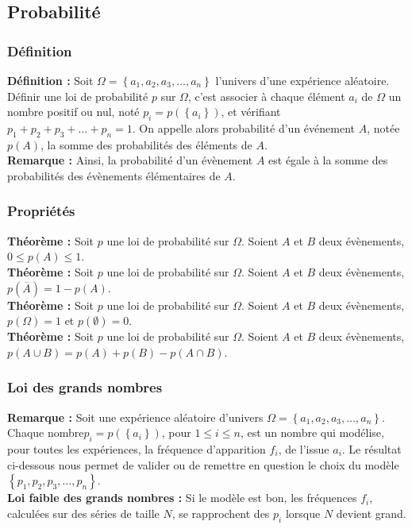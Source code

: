 \documentclass[a4paper,titlepage]{article}
\begin{document}
    \subsection{Probabilité}
        \subsubsection{Définition}
            \textbf{Définition :} Soit $\varOmega=\left\{a_{1},a_{2},a_{3},\ldots,a_{n}\right\}$ l’univers d’une expérience aléatoire. Définir une loi de probabilité $p$ sur $\varOmega$, c’est associer à chaque élément $a_{i}$ de $\varOmega$ un nombre positif ou nul, noté $p_{i}=p\left(\left\{a_{i}\right\}\right)$, et vérifiant $p_{1}+p_{2}+p_{3}+\ldots+p_{n}=1$. On appelle alors probabilité d’un événement $A$, notée $p\left(A\right)$, la somme des probabilités des éléments de $A$.
            \\
            \textbf{Remarque :} Ainsi, la probabilité d’un évènement $A$ est égale à la somme des probabilités des évènements élémentaires de $A$.
        \subsubsection{Propriétés}
            \textbf{Théorème :} Soit $p$ une loi de probabilité sur $\varOmega$. Soient $A$ et $B$ deux évènements, $0\leqslant p\left(A\right)\leqslant1$.
            \\
            \textbf{Théorème :} Soit $p$ une loi de probabilité sur $\varOmega$. Soient $A$ et $B$ deux évènements, $p\left(\overline{A}\right)=1-p\left(A\right)$.
            \\
            \textbf{Théorème :} Soit $p$ une loi de probabilité sur $\varOmega$. Soient $A$ et $B$ deux évènements, $p\left(\varOmega\right)=1$ et $p\left(\emptyset\right)=0$.
            \\
            \textbf{Théorème :} Soit $p$ une loi de probabilité sur $\varOmega$. Soient $A$ et $B$ deux évènements,\linebreak$p\left(A\cup B\right)=p\left(A\right)+p\left(B\right)-p\left(A\cap B\right)$.
        \subsubsection{Loi des grands nombres}
            \textbf{Remarque :} Soit une expérience aléatoire d’univers $\varOmega=\left\{a_{1},a_{2},a_{3},\ldots,a_{n}\right\}$. Chaque nombre\linebreak$p_{i}=p\left(\left\{a_{i}\right\}\right)$, pour $1\leqslant i\leqslant n$, est un nombre qui modélise, pour toutes les expériences, la fréquence d’apparition $f_{i}$, de l’issue $a_{i}$. Le résultat ci-dessous nous permet de valider ou de remettre en question le choix du modèle $\left\{p_{1},p_{2},p_{3},\ldots,p_{n}\right\}$.
            \\
            \textbf{Loi faible des grands nombres :} Si le modèle est bon, les fréquences $f_{i}$, calculées sur des séries de taille $N$, se rapprochent des $p_{i}$ lorsque $N$ devient grand.
\end{document}

